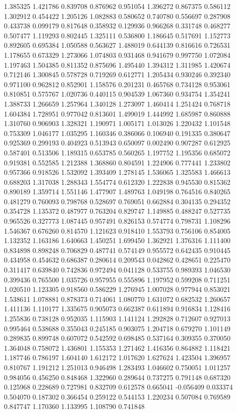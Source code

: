 1.385325
1.421786
0.839708
0.876962
0.951054
1.396272
0.867375
0.586112
1.302912
0.454422
1.205126
1.082883
0.580652
0.740780
0.556697
0.287908
0.433738
0.099179
0.817648
0.358932
0.129936
0.966268
0.331748
0.468277
0.507477
1.119293
0.802445
1.325111
0.536800
1.186645
0.517691
1.152773
0.892605
0.695384
1.050588
0.563627
1.488019
0.644139
0.816616
0.726531
1.178655
0.673329
1.273066
1.074803
0.931468
0.941679
0.997750
1.072084
1.197463
1.504385
0.811352
0.875696
1.495440
1.394312
1.311985
1.420674
0.712146
1.300845
0.578728
0.719269
0.612771
1.205434
0.930246
0.392340
0.971100
0.962812
0.852901
1.158576
0.201231
0.465768
0.734128
0.953061
0.810851
0.575767
1.020736
0.440115
0.904539
1.067360
0.934754
1.354241
1.388733
1.266659
1.257964
1.340128
1.273097
1.460414
1.251424
0.768718
1.604384
1.728951
0.977042
0.813601
1.499019
1.444992
1.685987
0.860888
1.310760
0.906903
1.328321
1.190971
1.005171
1.013026
1.220432
1.101548
0.753309
1.046177
1.035295
1.160346
0.386066
0.106940
0.191335
0.380647
0.925369
0.299193
0.404923
0.513943
0.650097
0.002490
0.907287
0.612925
0.587401
0.513506
1.189315
0.653785
0.560265
1.197752
1.195356
0.685072
0.919381
0.552585
1.212388
1.368860
0.804591
1.224906
0.777441
1.233802
0.957366
0.918526
1.532092
1.393409
1.278145
1.536065
1.325583
1.466613
0.688203
1.317038
1.288343
1.554774
0.612320
1.222838
0.945530
0.815362
0.890189
1.359714
1.551146
1.477907
1.489763
1.049198
0.764516
0.840265
0.481279
0.760093
0.798768
0.528697
0.769051
0.662884
0.304135
0.294352
0.354728
1.135372
0.487977
0.763204
0.829747
1.149885
0.488247
0.527735
0.965526
0.327773
1.087445
0.957491
0.826153
0.574774
0.798731
1.108296
1.546367
0.676260
0.814570
1.121623
0.918410
1.553793
0.756106
0.854005
1.132352
1.163186
1.640663
1.450251
1.699450
1.362921
1.376316
1.111400
0.834898
0.898248
0.706829
0.487741
0.574149
0.955572
0.642435
0.910445
0.434958
0.454632
0.686387
0.280614
0.209543
0.042862
0.428651
0.225470
0.311417
0.639840
0.742836
0.972494
0.041128
0.533755
0.989393
1.046530
0.399436
0.765500
1.035726
0.957955
0.555896
1.197952
0.599208
0.711251
1.020510
1.123305
0.918560
0.586229
1.276945
1.007028
0.977944
0.853021
1.538611
1.078881
0.878373
0.714061
1.080770
1.631072
0.682532
1.260657
1.411136
1.110177
1.335675
0.905073
0.662387
0.611894
0.916834
1.128416
1.255836
0.738128
0.952035
1.115903
1.141124
1.292828
0.712607
0.927013
0.995464
0.538688
0.355043
0.245185
0.903075
1.204718
0.679270
1.101149
0.289835
0.899748
0.607072
0.542592
0.698485
0.537164
0.309355
0.370050
1.364048
0.758072
1.436801
1.155353
1.271462
1.416356
0.864882
1.118421
1.187746
0.786197
1.604140
1.612172
1.017620
1.627624
1.423504
1.396957
0.810767
1.191212
1.251013
0.946498
1.283493
1.046602
0.750051
1.011257
0.984056
0.456250
0.848468
1.322960
0.289644
0.737275
0.791148
0.687320
0.125968
0.228689
0.727981
0.832709
0.612578
0.665041
-0.056409
0.033374
0.504070
0.187302
0.366454
0.259122
0.544153
1.220234
0.507084
0.769589
0.847747
1.170360
1.133995
1.108790
0.741848
